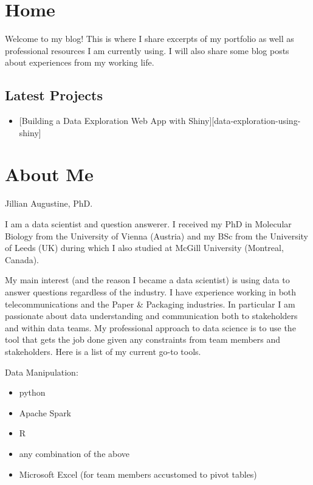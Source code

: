 \documentclass[]{book}
\title{}
\author{}
\date{}
\providecommand{\tightlist}{%
  \setlength{\itemsep}{0pt}\setlength{\parskip}{0pt}}
\begin{document}
{
\setcounter{tocdepth}{1}
\tableofcontents
}
\hypertarget{home}{%
\chapter*{Home}\label{home}}

Welcome to my blog! This is where I share excerpts of my portfolio as well as professional resources I am currently using. I will also share some blog posts about experiences from my working life.

\hypertarget{latest-projects}{%
\section{Latest Projects}\label{latest-projects}}

\begin{itemize}
\tightlist
\item
  {[}Building a Data Exploration Web App with Shiny{]}{[}data-exploration-using-shiny{]}
\end{itemize}

\hypertarget{about-me}{%
\chapter*{About Me}\label{about-me}}

Jillian Augustine, PhD.

I am a data scientist and question answerer. I received my PhD in Molecular Biology from the University of Vienna (Austria) and my BSc from the University of Leeds (UK) during which I also studied at McGill University (Montreal, Canada).

My main interest (and the reason I became a data scientist) is using data to answer questions regardless of the industry. I have experience working in both telecommunications and the Paper \& Packaging industries. In particular I am passionate about data understanding and communication both to stakeholders and within data teams. My professional approach to data science is to use the tool that gets the job done given any constraints from team members and stakeholders. Here is a list of my current go-to tools.

Data Manipulation:

\begin{itemize}
\tightlist
\item
  python
\item
  Apache Spark
\item
  R
\item
  any combination of the above
\item
  Microsoft Excel (for team members accustomed to pivot tables)
\end{itemize}
\end{document}
